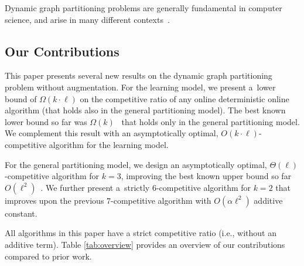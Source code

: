 \documentclass[a4paper,anonymous,USenglish]{lipics-v2019}
\begin{document}
Dynamic graph partitioning problems are generally fundamental in computer science, and arise in many different contexts~\cite{streaming-soda,streaming1}.


\subsection{Our Contributions}

This paper presents several new results on the dynamic graph partitioning problem  without augmentation.
For the learning model, we present a~lower bound of $\Omega(k\cdot\ell)$ on the competitive ratio of any online deterministic online algorithm 
(that holds also in the general partitioning model).
The best known lower bound so far was $\Omega(k)$~\cite{repartition-disc} that holds only in the general partitioning model.
We complement this result with an asymptotically optimal, 
$O(k\cdot \ell)$-competitive algorithm
for the learning model.

For the general partitioning model, we design
an asymptotically optimal,
$\Theta(\ell)$-competitive algorithm for $k=3$, improving the best known upper bound 
so far $O(\ell^2)$~\cite{repartition-disc}.
We further present a~strictly $6$-competitive algorithm for $k=2$ that improves upon the previous $7$-competitive algorithm with $O(\alpha\ell^2)$ additive constant.

All algorithms in this paper have a strict competitive ratio (i.e., without an additive term).
Table \ref{tab:overview} provides an overview of our contributions compared to prior work.
\end{document}
